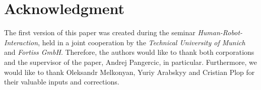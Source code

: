 \documentclass[conference]{IEEEtran}
\begin{document}
\section*{Acknowledgment}
The first version of this paper was created during the seminar \emph{Human-Robot-Interaction}, held in a joint cooperation by the \emph{Technical University of Munich} and \emph{Fortiss GmbH}. Therefore, the authors would like to thank both corporations and the supervisor of the paper, Andrej Pangercic, in particular. Furthermore, we would like to thank Oleksandr Melkonyan, Yuriy Arabskyy and Cristian Plop for their valuable inputs and corrections.





\end{document}
